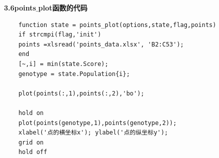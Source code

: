 \documentclass[UTF8]{ctexart}
\begin{document}
	\fontsize{14pt}{24pt}\begin{flushleft}
		\textbf{3.6points$\_$plot函数的代码}
	\end{flushleft}
	\fontsize{12pt}{24pt} 
	\lstset{language=matlab}
	\begin{lstlisting}
	function state = points_plot(options,state,flag,points)
	if strcmpi(flag,'init')
	points =xlsread('points_data.xlsx', 'B2:C53');
	end
	[~,i] = min(state.Score);
	genotype = state.Population{i};
	
	plot(points(:,1),points(:,2),'bo');
	
	hold on
	plot(points(genotype,1),points(genotype,2));
	xlabel('点的横坐标x'); ylabel('点的纵坐标y'); 
	grid on
	hold off
	
	\end{lstlisting}
	
\end{document}
